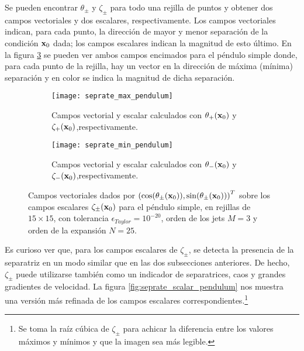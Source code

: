 Se pueden encontrar $\theta_\pm$ y $\zeta_\pm$ para todo una rejilla de puntos y obtener dos campos vectoriales y dos escalares, respectivamente. Los campos vectoriales indican, para cada punto, la dirección de mayor y menor separación de la condición $\mathbf{x}_0$ dada; los campos escalares indican la magnitud de esto último. En la figura \ref{fig:seprate_pendulum} se pueden ver ambos campos encimados para el péndulo simple donde, para cada punto de la rejilla, hay un vector en la dirección de máxima (mínima) separación y en color se indica la magnitud de dicha separación.

\begin{figure}[h!]
\centering
\begin{subfigure}{0.49\textwidth}
	\centering
	\texttt{[image: seprate\_max\_pendulum]}
	\caption{Campos vectorial y escalar calculados con $\theta_+(\mathbf{x}_0)$ y $\zeta_+(\mathbf{x}_0)$,respectivamente.}
	\label{fig:seprate_max_pendulum}
\end{subfigure}
%
\begin{subfigure}{0.49\textwidth}
	\centering
	\texttt{[image: seprate\_min\_pendulum]}
	\caption{Campos vectorial y escalar calculados con $\theta_-(\mathbf{x}_0)$ y $\zeta_-(\mathbf{x}_0)$,respectivamente.}
	\label{fig:seprate_min_pendulum}
\end{subfigure}
\caption{ Campos vectoriales dados por $\left( \cos(\theta_\pm(\mathbf{x}_0)),\sin(\theta_\pm(\mathbf{x}_0)) \right)^T$ sobre los campos escalares $\zeta_\pm(\mathbf{x}_0)$ para el péndulo simple, en rejillas de $15\times15$, con tolerancia $\epsilon_{Taylor} = 10^{-20}$, orden de los jets $M=3$ y orden de la expansión $N=25$. }
\label{fig:seprate_pendulum}
\end{figure}

Es curioso ver que, para los campos escalares de $\zeta_\pm$, se detecta la presencia de la separatriz en un modo similar que en las dos subsecciones anteriores. De hecho, $\zeta_\pm$ puede utilizarse también como un indicador de separatrices, caos y grandes gradientes de velocidad. La figura \ref{fig:seprate_scalar_pendulum} nos muestra una versión más refinada de los campos escalares correspondientes.\footnote{Se toma la raíz cúbica de $\zeta_\pm$ para achicar la diferencia entre los valores máximos y mínimos y que la imagen sea más legible.} 

